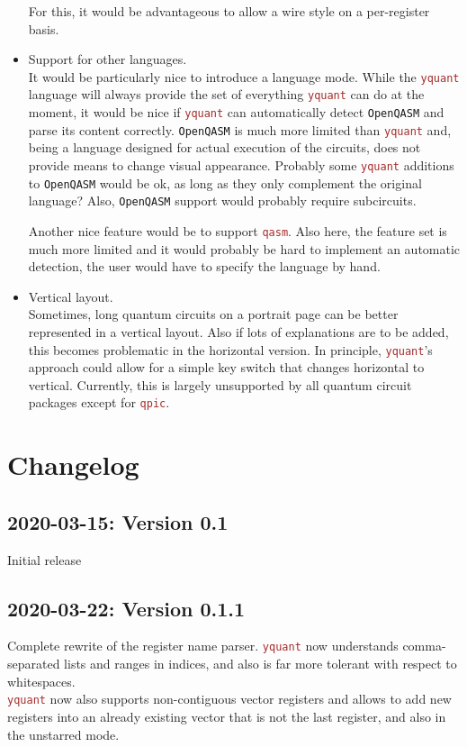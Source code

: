 \documentclass{scrartcl}
\def\pkg#1{\textcolor{brown}{\texttt{#1}}}
\def\Yquant{\pkg{yquant}}
\begin{document}
\begin{itemize}
            For this, it would be advantageous to allow a wire style on a per\hyp register basis.
         \item Support for other languages. \\
            It would be particularly nice to introduce a language mode.
            While the \Yquant{} language will always provide the set of everything \Yquant{} can do at the moment, it would be nice if \Yquant{} can automatically detect \texttt{OpenQASM} and parse its content correctly.
            \texttt{OpenQASM} is much more limited than \Yquant{} and, being a language designed for actual execution of the circuits, does not provide means to change visual appearance.
            Probably some \Yquant{} additions to \texttt{OpenQASM} would be ok, as long as they only complement the original language?
            Also, \texttt{OpenQASM} support would probably require subcircuits.
            
            Another nice feature would be to support \pkg{qasm}.
            Also here, the feature set is much more limited and it would probably be hard to implement an automatic detection, the user would have to specify the language by hand.
         \item Vertical layout. \\
            Sometimes, long quantum circuits on a portrait page can be better represented in a vertical layout.
            Also if lots of explanations are to be added, this becomes problematic in the horizontal version.
            In principle, \Yquant's approach could allow for a simple key switch that changes horizontal to vertical.
            Currently, this is largely unsupported by all quantum circuit packages except for \pkg{qpic}.
      \end{itemize}
   
   \section{Changelog}
      \subsection{2020-03-15: Version 0.1}
         Initial release
      
      \subsection{2020-03-22: Version 0.1.1}
         Complete rewrite of the register name parser.
         \Yquant{} now understands comma\hyp separated lists and ranges in indices, and also is far more tolerant with respect to whitespaces. \\
         \Yquant{} now also supports non\hyp contiguous vector registers and allows to add new registers into an already existing vector that is not the last register, and also in the unstarred mode.
\end{document}
